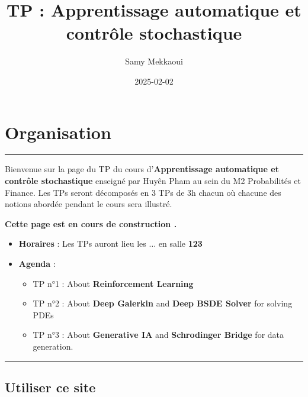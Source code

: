 \documentclass[
  10,
  letterpaper,
  DIV=11,
  numbers=noendperiod]{scrreport}
\title{TP : Apprentissage automatique et contrôle stochastique}
\author{Samy Mekkaoui}
\date{2025-02-02}
\providecommand{\tightlist}{%
  \setlength{\itemsep}{0pt}\setlength{\parskip}{0pt}}\usepackage{longtable,booktabs,array}
\renewcommand*\contentsname{Table des matières}
\newcommand\contentsname{Table des matières}
\theoremstyle{plain}
\theoremstyle{definition}
\theoremstyle{definition}
\theoremstyle{remark}
\begin{document}
\maketitle

\renewcommand*\contentsname{Table des matières}
{
\hypersetup{linkcolor=}
\setcounter{tocdepth}{2}
\tableofcontents
}


\chapter*{Organisation}\label{organisation}


\begin{center}\rule{0.5\linewidth}{0.5pt}\end{center}

Bienvenue sur la page du TP du cours d'\textbf{Apprentissage automatique
et contrôle stochastique} enseigné par Huyên Pham au sein du M2
Probabilités et Finance. Les TPs seront décomposés en 3 TPs de 3h chacun
où chacune des notions abordée pendant le cours sera illustré.

\textbf{Cette page est en cours de construction .}

\begin{itemize}
\item
  \textbf{Horaires} : Les TPs auront lieu les \(\ldots\) en salle
  \textbf{123}
\item
  \textbf{Agenda} :

  \begin{itemize}
  \tightlist
  \item
    TP n°1 : About \textbf{Reinforcement Learning}
  \item
    TP n°2 : About \textbf{Deep Galerkin} and \textbf{Deep BSDE Solver}
    for solving PDEs
  \item
    TP n°3 : About \textbf{Generative IA} and \textbf{Schrodinger
    Bridge} for data generation.
  \end{itemize}
\end{itemize}

\begin{center}\rule{0.5\linewidth}{0.5pt}\end{center}

\section*{Utiliser ce site}\label{utiliser-ce-site}
\end{document}
